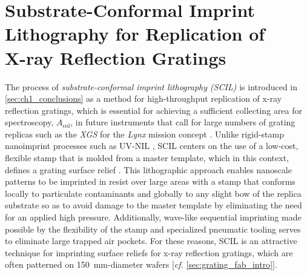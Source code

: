 \chapter[Substrate-Conformal Imprint Lithography (SCIL) for Replication of X-ray Reflection Gratings]{Substrate-Conformal Imprint \\Lithography for Replication of \\X-ray Reflection Gratings}\label{ch:grating_replication} 
The process of \emph{substrate-conformal imprint lithography (SCIL)} \cite{Verschuuren10} is introduced in \cref{sec:ch1_conclusions} as a method for high-throughput replication of x-ray reflection gratings, which is essential for achieving a sufficient collecting area for spectroscopy, $A_{\text{col}}$, in future instruments that call for large numbers of grating replicas such as the \emph{XGS} for the \emph{Lynx} mission concept \cite[\emph{cf.\@} \cref{sec:astro_plasmas,sec:grating_tech_dev}]{Gaskin19,McEntaffer19}. 
Unlike rigid-stamp nanoimprint processes such as UV-NIL \cite[\emph{cf.\@} \cref{sec:nanoimprint}]{Chou96,Haisma96,Schift08,Schift10}, SCIL centers on the use of a low-cost, flexible stamp that is molded from a master template, which in this context, defines a grating surface relief \cite{Verschuuren10,Verschuuren17,Verschuuren19}. 
This lithographic approach enables nanoscale patterns to be imprinted in resist over large areas with a stamp that conforms locally to particulate contaminants and globally to any slight bow of the replica substrate so as to avoid damage to the master template by eliminating the need for an applied high pressure. 
Additionally, wave-like sequential imprinting made possible by the flexibility of the stamp and specialized pneumatic tooling serves to eliminate large trapped air pockets. 
For these reasons, SCIL is an attractive technique for imprinting surface reliefs for x-ray reflection gratings, which are often patterned on \SI{150}{\mm}-diameter wafers [\emph{cf.\@} \cref{sec:grating_fab_intro}]. 

